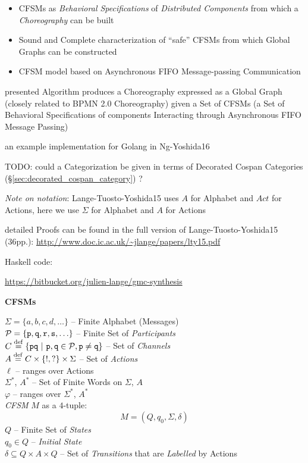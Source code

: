 \begin{itemize}
\item CFSMs as \emph{Behavioral Specifications} of \emph{Distributed
  Components} from which a \emph{Choreography} can be built
\item Sound and Complete characterization of ``safe'' CFSMs from which
  Global Graphs can be constructed
\item CFSM model based on Asynchronous FIFO Message-passing
  Communication
\end{itemize}

presented Algorithm produces a Choreography expressed as a Global Graph
(closely related to BPMN 2.0 Choreography) given a Set of CFSMs (a Set
of Behavioral Specifications of components Interacting through
Asynchronous FIFO Message Passing)

\fist an example implementation for Golang in Ng-Yoshida16

TODO: could a Categorization be given in terms of Decorated Cospan
Categories (\S\ref{sec:decorated_cospan_category}) ?

\asterism

\emph{Note on notation}: Lange-Tuosto-Yoshida15 uses $A$ for
Alphabet and $Act$ for Actions, here we use $\Sigma$ for Alphabet and
$A$ for Actions

detailed Proofs can be found in the full version of
Lange-Tuosto-Yoshida15 (36pp.):
\url{http://www.doc.ic.ac.uk/~jlange/papers/lty15.pdf}

Haskell code:

\url{https://bitbucket.org/julien-lange/gmc-synthesis}


\textbf{CFSMs}

$\Sigma = \{ a,b,c,d,\ldots \}$ -- Finite Alphabet (Messages) \\
$\mathcal{P} = \{ \mathtt{p, q, r, s},\ldots\}$
-- Finite Set of \emph{Participants} \\
$C \stackrel{\mathrm{def}}= \{ \mathtt{pq}
  \ |\ \mathtt{p,q} \in \mathcal{P}, \mathtt{p \neq q} \}$
-- Set of \emph{Channels} \\
$A \stackrel{\mathrm{def}}= C \times \{!,?\} \times \Sigma$ -- Set of \emph{Actions} \\
$\ell$ -- ranges over Actions \\
$\Sigma^*$, $A^*$ -- Set of Finite Words on $\Sigma$, $A$ \\
$\varphi$ -- ranges over $\Sigma^*$, $A^*$ \\

\emph{CFSM} $M$ as a $4$-tuple:
\[
  M = (Q, q_0, \Sigma, \delta)
\]
$Q$ -- Finite Set of \emph{States} \\
$q_0 \in Q$ -- \emph{Initial State} \\
$\delta \subseteq Q \times A \times Q$ -- Set of \emph{Transitions}
that are \emph{Labelled} by Actions \\

